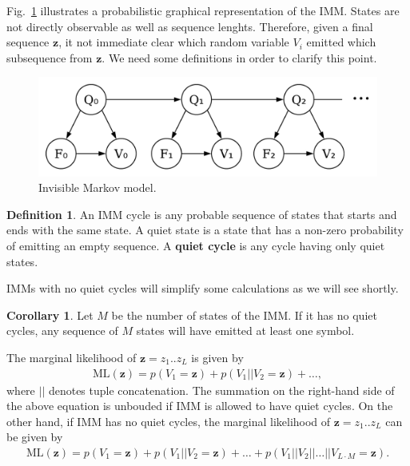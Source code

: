 \documentclass[a4paper]{article}
\theoremstyle{definition}
\theoremstyle{definition}
\newtheorem{definition}{Definition}[section]
\theoremstyle{definition}
\newtheorem{corollary}{Corollary}[section]
\begin{document}
Fig.~\ref{fig:imm} illustrates a probabilistic graphical representation of the IMM.
States are not directly observable as well as sequence lenghts.
Therefore, given a final sequence $\mathbf z$, it not immediate clear which random variable $V_i$ emitted
which subsequence from $\mathbf z$.
We need some definitions in order to clarify this point.

\begin{figure}[htbp]
\centering
\includegraphics[width=.45\linewidth]{imm}
\caption{Invisible Markov model.}%
\label{fig:imm}
\end{figure}

\begin{definition}
    An IMM cycle is any probable sequence of states that starts and ends with the same state.
    A quiet state is a state that has a non-zero probability of emitting an empty sequence.
    A \textbf{quiet cycle} is any cycle having only quiet states.
\end{definition}

IMMs with no quiet cycles will simplify some calculations as we will see shortly.

\begin{corollary}
Let $M$ be the number of states of the IMM.
If it has no quiet cycles, any sequence of $M$ states will have emitted at least one symbol.
\end{corollary}

The marginal likelihood of $\mathbf z=z_1 .. z_L$ is given by
\begin{align}\label{eq:ml}
    \mathrm{ML}(\mathbf z) = p(V_1=\mathbf z) + p(V_1||V_2=\mathbf z) + \dots,
\end{align}
where $||$ denotes tuple concatenation.
The summation on the right-hand side of the above equation is unbouded if IMM is allowed to have
quiet cycles.
On the other hand, if IMM has no quiet cycles, the marginal likelihood of $\mathbf z=z_1 .. z_L$
can be given by
\begin{align*}
    \mathrm{ML}(\mathbf z) =
    p(V_1=\mathbf z) + p(V_1||V_2=\mathbf z) + \dots + p(V_1||V_2||\dots||V_{L\cdot M}=\mathbf z).
\end{align*}
\end{document}
